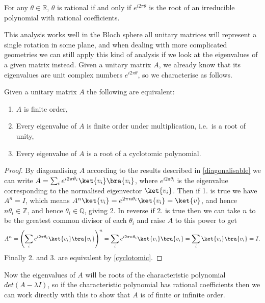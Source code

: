\begin{theorem}\label{cyclotomic} For any $\theta \in \mathbb{R}$, $\theta$ is rational if and only if $e^{i2\pi \theta}$ is the root of an irreducible polynomial with rational coefficients.
\end{theorem}

This analysis works well in the Bloch sphere all unitary matrices will represent a single rotation in some plane, and when dealing with more complicated geometries we can still apply this kind of analysis if we look at the eigenvalues of a given matrix instead. Given a unitary matrix $A$, we already know that its eigenvalues are unit complex numbers $e^{i 2\pi\theta}$, so we characterise as follows.

\begin{prop}Given a unitary matrix $A$ the following are equivalent:
\begin{enumerate}
	\item $A$ is finite order,
	\item Every eigenvalue of $A$ is finite order under multiplication, i.e.\ is a root of unity,
	\item Every eigenvalue of $A$ is a root of a cyclotomic polynomial.
\end{enumerate}
\end{prop}
\begin{proof}
	By diagonalising $A$ according to the results described in \autoref{diagonalisable} we can write $A = \sum_i e^{i2\pi\theta_i}\ket{v_i}\bra{v_i}$, where $e^{i2\pi\theta_i}$ is the eigenvalue corresponding to the normalised eigenvector $\ket{v_i}$. Then if 1. is true we have $A^n = I$, which means $A^n\ket{v_i} = e^{2\pi n\theta_i}\ket{v_i} = \ket{v}$, and hence $n\theta_i \in \mathbb{Z}$, and hence $\theta_i \in \mathbb{Q}$, giving 2. In reverse if 2. is true then we can take $n$ to be the greatest common divisor of each $\theta_i$ and raise $A$ to this power to get
	\[A^n = \left(\sum_i e^{i2\pi\theta_i}\ket{v_i}\bra{v_i}\right)^n = \sum_i e^{i2\pi n \theta_i}\ket{v_i}\bra{v_i} = \sum_i \ket{v_i}\bra{v_i} = I.\]
	Finally 2. and 3. are equivalent by \autoref{cyclotomic}.
\end{proof}
Now the eigenvalues of $A$ will be roots of the characteristic polynomial $det(A - \lambda I)$, so if the characteristic polynomial has rational coefficients then we can work directly with this to show that $A$ is of finite or infinite order. 

